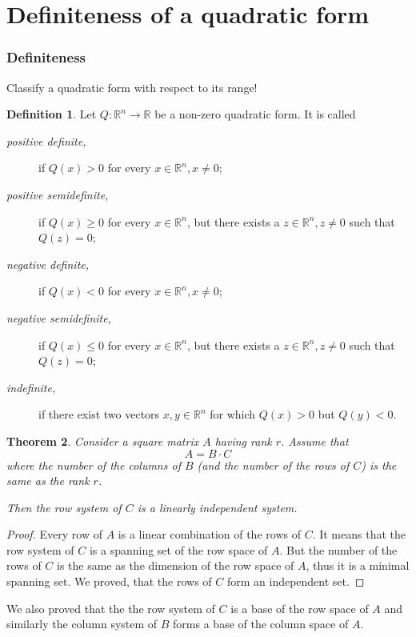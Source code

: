 \documentclass[aspectratio=169,notheorems]{corvinusmetropolis}
\newtheorem{theorem}{Theorem}
\theoremstyle{definition}
\newtheorem{definition}[theorem]{Definition}
\begin{document}
\section{Definiteness of a quadratic form}
\begin{frame}
    \frametitle{Definiteness}
    Classify a quadratic form with respect to its range!
    \begin{definition}
        Let $Q:\mathbb{R}^n\to\mathbb{R}$ be a non-zero quadratic form. It is called
        \begin{description}
            \item[\emph{positive definite,}] if $Q\left( x \right)>0$ for every $x\in\mathbb{R}^n,x\neq 0$;
        \item[\emph{positive semidefinite,}] if $ Q\left( x \right)\geq 0$ for every $x\in\mathbb{R}^n$,
                but there exists a $z\in\mathbb{R}^n, z\neq 0$ such that $Q\left( z \right)=0$;
            \item[\emph{negative definite,}] if $ Q\left( x \right)<0$ for every $x\in\mathbb{R}^n,x\neq 0;$
            \item[\emph{negative semidefinite,}] if $ Q\left( x \right)\leq 0$ for every $x\in\mathbb{R}^n$,
                but there exists a $z\in\mathbb{R}^n, z\neq 0$ such that $Q\left( z \right)=0$;
            \item[\emph{indefinite,}] if there exist two vectors $x,y\in\mathbb{R}^n$ for which
                $Q\left( x \right)>0$ but $Q\left( y \right)<0$.
        \end{description}
    \end{definition}
\end{frame}
\begin{frame}
    \begin{theorem}
    Consider a square matrix $A$ having rank $r$. 
    Assume that 
    \[A=B\cdot C\] 
    where the number of the columns of $B$ (and the number of the rows of $C$) is the same as the rank $r$.
    
    Then the row system of $C$ is a linearly independent system.
    \end{theorem}
    \begin{proof}
        Every row of $A$ is a linear combination of the rows of $C$.
        It means that the row system of $C$ is a spanning set of the row space of $A$.
        But the number of the rows of $C$ is the same as the dimension of the row space of $A$, 
        thus it is a minimal spanning set.
        We proved, that the rows of $C$ form an independent set.
    \end{proof}
    We also proved that the 
    the row system of $C$ is a base of the row space of $A$ and similarly 
    the column system of $B$ forms a base of the column space of $A$.
\end{frame}
\end{document}
